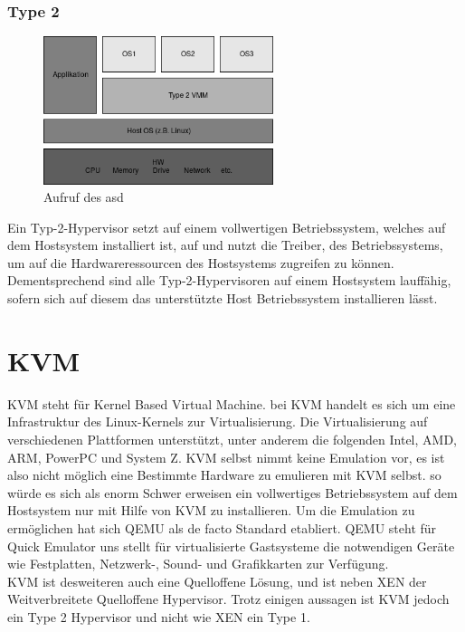 \documentclass[14pt]{extreport}
\begin{document}
\subsubsection{Type 2}
\begin{figure}
	\begin{center}
		\includegraphics[width=0.6\textwidth]{png/VMMType2.png}
		\caption{Aufruf des asd}
		\label{fig:as}
	\end{center}
\end{figure}
Ein Typ-2-Hypervisor setzt auf einem vollwertigen Betriebssystem, welches auf dem Hostsystem installiert ist, auf und nutzt die Treiber, des Betriebssystems, um auf die Hardwareressourcen des Hostsystems zugreifen zu können. Dementsprechend sind alle Typ-2-Hypervisoren auf einem Hostsystem lauffähig, sofern sich auf diesem das unterstützte Host Betriebssystem installieren lässt.
\section{KVM}
KVM steht für Kernel Based Virtual Machine. bei KVM handelt es sich um eine Infrastruktur des Linux-Kernels zur Virtualisierung. Die Virtualisierung auf verschiedenen Plattformen unterstützt, unter anderem die folgenden Intel, AMD, ARM, PowerPC und System Z. KVM selbst nimmt keine Emulation vor, es ist also nicht möglich eine Bestimmte Hardware zu emulieren mit KVM selbst. so würde es sich als enorm Schwer erweisen ein vollwertiges Betriebssystem auf dem Hostsystem nur mit Hilfe von KVM zu installieren. Um die Emulation zu ermöglichen hat sich QEMU als de facto Standard etabliert. QEMU steht für Quick Emulator uns stellt für virtualisierte Gastsysteme die notwendigen Geräte wie Festplatten, Netzwerk-, Sound- und Grafikkarten zur Verfügung.\\
KVM ist desweiteren auch eine Quelloffene Lösung, und ist neben XEN der Weitverbreitete Quelloffene Hypervisor. Trotz einigen aussagen ist KVM jedoch ein Type 2 Hypervisor und nicht wie XEN ein Type 1.
\end{document}
